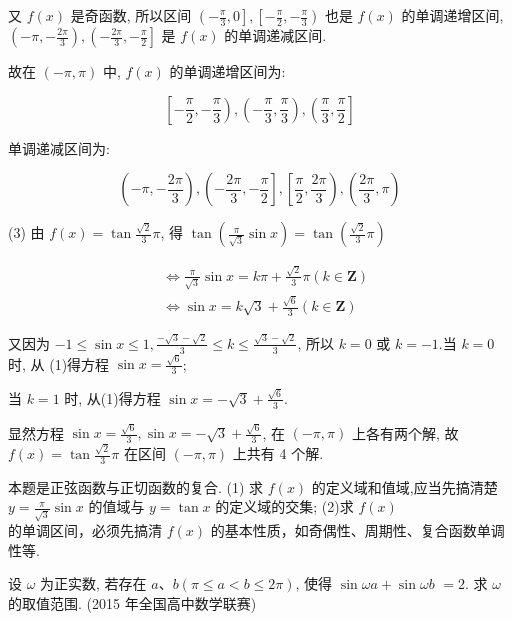 \begin{solution}
				又 $f(x)$ 是奇函数, 所以区间 $\left(-\frac{\pi}{3}, 0\right],\left[-\frac{\pi}{2},-\frac{\pi}{3}\right)$ 也是 $f(x)$ 的单调递增区间, $\left(-\pi,-\frac{2 \pi}{3}\right),\left(-\frac{2 \pi}{3},-\frac{\pi}{2}\right]$ 是 $f(x)$ 的单调递减区间.

	故在 $(-\pi, \pi)$ 中, $f(x)$ 的单调递增区间为:

	$$
		\left[-\frac{\pi}{2},-\frac{\pi}{3}\right),\left(-\frac{\pi}{3}, \frac{\pi}{3}\right),\left(\frac{\pi}{3}, \frac{\pi}{2}\right]
	$$

	单调递减区间为:

	$$
		\left(-\pi,-\frac{2 \pi}{3}\right),\left(-\frac{2 \pi}{3},-\frac{\pi}{2}\right],\left[\frac{\pi}{2}, \frac{2 \pi}{3}\right),\left(\frac{2 \pi}{3}, \pi\right)
	$$

	(3) 由 $f(x)=\tan \frac{\sqrt{2}}{3} \pi$, 得 $\tan \left(\frac{\pi}{\sqrt{3}} \sin x\right)=\tan \left(\frac{\sqrt{2}}{3} \pi\right)$


	\begin{align*}
		 & \Leftrightarrow \frac{\pi}{\sqrt{3}} \sin x=k \pi+\frac{\sqrt{2}}{3} \pi(k \in \mathbf{Z}) \\
		 & \Leftrightarrow \sin x=k \sqrt{3}+\frac{\sqrt{6}}{3}(k \in \mathbf{Z}) \tag{1}
	\end{align*}


	又因为 $-1 \leqslant \sin x \leqslant 1, \frac{-\sqrt{3}-\sqrt{2}}{3} \leqslant k \leqslant \frac{\sqrt{3}-\sqrt{2}}{3}$, 所以 $k=0$ 或 $k=-1$.当 $k=0$ 时, 从 (1)得方程 $\sin x=\frac{\sqrt{6}}{3}$;

	当 $k=1$ 时, 从(1)得方程 $\sin x=-\sqrt{3}+\frac{\sqrt{6}}{3}$.

	显然方程 $\sin x=\frac{\sqrt{6}}{3}, \sin x=-\sqrt{3}+\frac{\sqrt{6}}{3}$, 在 $(-\pi, \pi)$ 上各有两个解, 故 $f(x)=\tan \frac{\sqrt{2}}{3} \pi$ 在区间 $(-\pi, \pi)$ 上共有 4 个解.
\end{solution}

\begin{note}
	本题是正弦函数与正切函数的复合. (1) 求 $f(x)$ 的定义域和值域,应当先搞清楚 $y=\frac{\pi}{\sqrt{3}} \sin x$ 的值域与 $y=\tan x$ 的定义域的交集; (2)求 $f(x)$\\
	的单调区间，必须先搞清 $f(x)$ 的基本性质，如奇偶性、周期性、复合函数单调性等.
\end{note}

\begin{example}
	设 $\omega$ 为正实数, 若存在 $a 、 b(\pi \leqslant a<b \leqslant 2 \pi)$, 使得 $\sin \omega a+\sin \omega b$ $=2$. 求 $\omega$ 的取值范围. (2015 年全国高中数学联赛)
\end{example}

